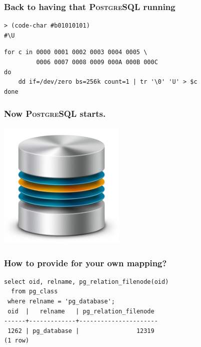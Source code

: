 \documentclass{beamer}
\begin{document}
\begin{frame}[fragile]
  \frametitle{Back to having that \textsc{PostgreSQL} running}

  \vfill

\begin{verbatim}
> (code-char #b01010101)
#\U
\end{verbatim}

\vfill
\begin{verbatim}
for c in 0000 0001 0002 0003 0004 0005 \
         0006 0007 0008 0009 000A 000B 000C
do
    dd if=/dev/zero bs=256k count=1 | tr '\0' 'U' > $c
done
\end{verbatim}
\end{frame}

\begin{frame}
  \frametitle{Now \textsc{PostgreSQL} starts.}

  \vfill
  
  \begin{center}
    \includegraphics[height=2.4in]{LRN-LNP-database.png}
  \end{center}
\end{frame}

\begin{frame}[fragile]
  \frametitle{How to provide for your own mapping?}

  \begin{center}
  \begin{verbatim}
select oid, relname, pg_relation_filenode(oid)
  from pg_class
 where relname = 'pg_database';
 oid  |   relname   | pg_relation_filenode 
------+-------------+----------------------
 1262 | pg_database |                12319
(1 row)
  \end{verbatim}  
  \end{center}
\end{frame}
\end{document}
